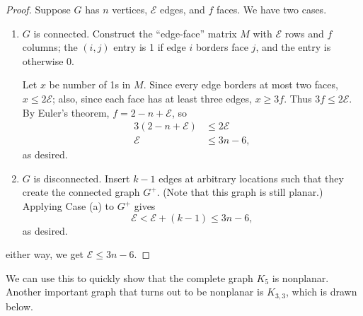 \documentclass[../m055main.tex]{subfiles}
\begin{document}
\begin{proof}
    Suppose $G$ has $n$ vertices, $\mathcal{E}$ edges, and $f$ faces.
    We have two cases.
    \begin{enumerate}[label=(\alph*)]
        \item $G$ is connected.
        Construct the ``edge-face'' matrix $M$ with $\mathcal{E}$ rows and $f$ columns; the $(i,j)$ entry is 1 if edge $i$ borders face $j$, and the entry is otherwise 0.

        Let $x$ be number of 1s in $M$.
        Since every edge borders at most two faces, $x \leq 2\mathcal{E}$; also, since each face has at least three edges, $x \geq 3f$.
        Thus $3f \leq  2\mathcal{E}$.
        By Euler's theorem, $f = 2 - n + \mathcal{E}$, so
        \begin{align*}
            3(2 - n + \mathcal{E}) &\leq 2\mathcal{E} \\
            \mathcal{E} &\leq 3n - 6,
        \end{align*}
        as desired.

        \item $G$ is disconnected.
        Insert $k-1$ edges at arbitrary locations such that they create the connected graph $G^+$.
        (Note that this graph is still planar.)
        Applying Case (a) to $G^+$ gives
        \[ \mathcal{E} < \mathcal{E} + (k - 1) \leq 3n - 6, \]
        as desired.
    \end{enumerate}
    either way, we get $\mathcal{E} \leq 3n - 6$.
\end{proof}

We can use this to quickly show that the complete graph $K_5$ is nonplanar.
Another important graph that turns out to be nonplanar is $K_{3,3}$, which is drawn below.

\begin{center}
\end{center}
\end{document}
